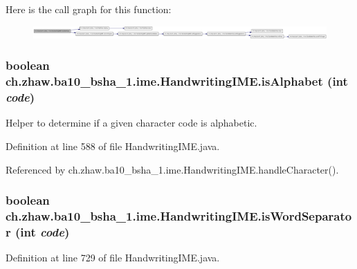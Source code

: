 Here is the call graph for this function:\nopagebreak
\begin{figure}[H]
\begin{center}
\leavevmode
\includegraphics[width=420pt]{classch_1_1zhaw_1_1ba10__bsha__1_1_1ime_1_1HandwritingIME_a4287014b4f552f286e8b51ef841573b1_cgraph}
\end{center}
\end{figure}
\hypertarget{classch_1_1zhaw_1_1ba10__bsha__1_1_1ime_1_1HandwritingIME_a0cc6d7c254ce701f73f5852bafe294b4}{
\subsubsection[{isAlphabet}]{\setlength{\rightskip}{0pt plus 5cm}boolean ch.zhaw.ba10\_\-bsha\_\-1.ime.HandwritingIME.isAlphabet (int {\em code})}}
\label{classch_1_1zhaw_1_1ba10__bsha__1_1_1ime_1_1HandwritingIME_a0cc6d7c254ce701f73f5852bafe294b4}
Helper to determine if a given character code is alphabetic. 

Definition at line 588 of file HandwritingIME.java.

Referenced by ch.zhaw.ba10\_\-bsha\_\-1.ime.HandwritingIME.handleCharacter().\hypertarget{classch_1_1zhaw_1_1ba10__bsha__1_1_1ime_1_1HandwritingIME_aeef9b5d4fa9f314d5bf17331645ba93b}{
\subsubsection[{isWordSeparator}]{\setlength{\rightskip}{0pt plus 5cm}boolean ch.zhaw.ba10\_\-bsha\_\-1.ime.HandwritingIME.isWordSeparator (int {\em code})}}
\label{classch_1_1zhaw_1_1ba10__bsha__1_1_1ime_1_1HandwritingIME_aeef9b5d4fa9f314d5bf17331645ba93b}


Definition at line 729 of file HandwritingIME.java.


